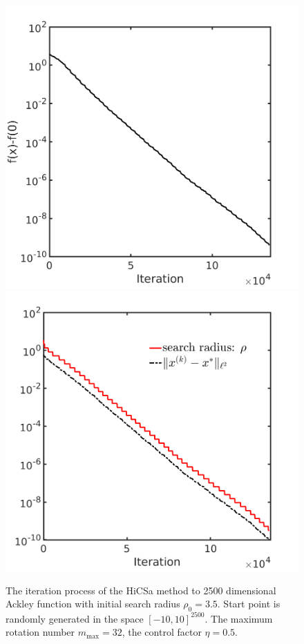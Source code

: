 \documentclass[final,1p,times]{elsarticle}
\begin{document}
\begin{figure}[!htbp] 
	\centering
	\includegraphics[scale=0.2]{../figures/ackley2500D.png}
	\includegraphics[scale=0.2]{../figures/ackley2500D_dist.png}
	  \caption{The iteration process of the HiCSa method to 2500
	  dimensional Ackley function with initial search
	  radius $\rho_0=3.5$. Start point is randomly generated in the
	  space $[-10, 10]^{2500}$. The maximum rotation number
	  $m_{\max}=32$, the control factor $\eta=0.5$.  } 
	\label{fig:ackley2500D:HiCSa}
\end{figure}
\end{document}
